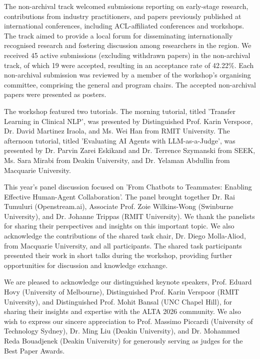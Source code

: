 The non-archival track welcomed submissions reporting on early-stage research, contributions from industry practitioners, and papers previously published at international conferences, including ACL-affiliated conferences and workshops. The track aimed to provide a local forum for disseminating internationally recognised research and fostering discussion among researchers in the region. We received 45 active submissions (excluding withdrawn papers) in the non-archival track, of which 19 were accepted, resulting in an acceptance rate of 42.22\%. Each non-archival submission was reviewed by a member of the workshop's organising committee, comprising the general and program chairs. The accepted non-archival papers were presented as posters. \newline


The workshop featured two tutorials. The morning tutorial, titled 'Transfer Learning in Clinical NLP', was presented by Distinguished Prof. Karin Verspoor, Dr. David Martinez Iraola, and Ms. Wei Han from RMIT University. The afternoon tutorial, titled 'Evaluating AI Agents with LLM-as-a-Judge', was presented by Dr. Parvin Zarei Eskikand and Dr. Terrence Szymanski from SEEK, Ms. Sara Mirabi from Deakin University, and Dr. Yelaman Abdullin from Macquarie University. \newline


This year's panel discussion focused on 'From Chatbots to Teammates: Enabling Effective Human-Agent Collaboration'. The panel brought together Dr. Rai Tumuluri (Openstream.ai), Associate Prof. Zoie Wilkins-Wong (Swinburne University), and Dr. Johanne Trippas (RMIT University). We thank the panelists for sharing their perspectives and insights on this important topic. We also acknowledge the contributions of the shared task chair, Dr. Diego Molla-Aliod, from Macquarie University, and all participants. The shared task participants presented their work in short talks during the workshop, providing further opportunities for discussion and knowledge exchange. \newline


We are pleased to acknowledge our distinguished keynote speakers, Prof. Eduard Hovy (University of Melbourne), Distinguished Prof. Karin Verspoor (RMIT University), and Distinguished Prof. Mohit Bansal (UNC Chapel Hill), for sharing their insights and expertise with the ALTA 2026 community. We also wish to express our sincere appreciation to Prof. Massimo Piccardi (University of Technology Sydney), Dr. Ming Liu (Deakin University), and Dr. Mohammed Reda Bouadjenek (Deakin University) for generously serving as judges for the Best Paper Awards. \newline


